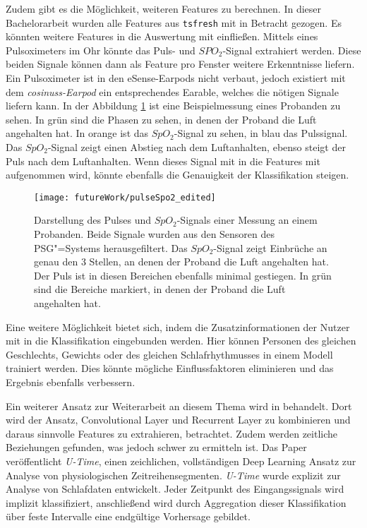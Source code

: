 Zudem gibt es die Möglichkeit, weiteren Features zu berechnen.
In dieser Bachelorarbeit wurden alle Features aus \texttt{tsfresh} mit in Betracht gezogen. 
Es könnten weitere Features in die Auswertung mit einfließen.
Mittels eines Pulsoximeters im Ohr könnte das Puls- und $SPO_2$-Signal extrahiert werden. 
Diese beiden Signale können dann als Feature pro Fenster weitere Erkenntnisse liefern.
Ein Pulsoximeter ist in den eSense-Earpods nicht verbaut, jedoch existiert mit dem \textit{cosinuss\textdegree -Earpod} ein entsprechendes Earable, welches die nötigen Signale liefern kann.
In der Abbildung \ref{futureWork:pulseSpo2} ist eine Beispielmessung eines Probanden zu sehen. 
In grün sind die Phasen zu sehen, in denen der Proband die Luft angehalten hat.
In orange ist das $SpO_2$-Signal zu sehen, in blau das Pulssignal. 
Das $SpO_2$-Signal zeigt einen Abstieg nach dem Luftanhalten, ebenso steigt der Puls nach dem Luftanhalten.
Wenn dieses Signal mit in die Features mit aufgenommen wird, könnte ebenfalls die Genauigkeit der Klassifikation steigen. 
\begin{figure}[ht]
    \centering
    \texttt{[image: futureWork/pulseSpo2\_edited]}
    \caption{Darstellung des Pulses und $SpO_2$-Signals einer Messung an einem Probanden. Beide Signale wurden aus den Sensoren des PSG"=Systems herausgefiltert. Das $SpO_2$-Signal zeigt Einbrüche an genau den 3 Stellen, an denen der Proband die Luft angehalten hat. Der Puls ist in diesen Bereichen ebenfalls minimal gestiegen. In grün sind die Bereiche markiert, in denen der Proband die Luft angehalten hat.}
    \label{futureWork:pulseSpo2}
\end{figure}

Eine weitere Möglichkeit bietet sich, indem die Zusatzinformationen der Nutzer mit in die Klassifikation eingebunden werden.
Hier können Personen des gleichen Geschlechts, Gewichts oder des gleichen Schlafrhythmusses in einem Modell trainiert werden.
Dies könnte mögliche Einflussfaktoren eliminieren und das Ergebnis ebenfalls verbessern.

Ein weiterer Ansatz zur Weiterarbeit an diesem Thema wird in \cite{perslevUTimeFullyConvolutional2019} behandelt.
Dort wird der Ansatz, Convolutional Layer und Recurrent Layer zu kombinieren und daraus sinnvolle Features zu extrahieren, betrachtet. 
Zudem werden zeitliche Beziehungen gefunden, was jedoch schwer zu ermitteln ist. 
Das Paper veröffentlicht \textit{U-Time}, einen zeichlichen, vollständigen Deep Learning Ansatz zur Analyse von physiologischen Zeitreihensegmenten. 
\textit{U-Time} wurde explizit zur Analyse von Schlafdaten entwickelt.
Jeder Zeitpunkt des Eingangssignals wird implizit klassifiziert, anschließend wird durch Aggregation dieser Klassifikation über feste Intervalle eine endgültige Vorhersage gebildet.